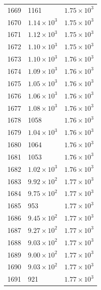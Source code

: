 \begin{table}[H]
\begin{tabular}{lll}
1669 & 1161 & $\displaystyle 1.75 \times 10^{3}$ \\
1670 & $\displaystyle 1.14 \times 10^{3}$ & $\displaystyle 1.75 \times 10^{3}$ \\
1671 & $\displaystyle 1.12 \times 10^{3}$ & $\displaystyle 1.75 \times 10^{3}$ \\
1672 & $\displaystyle 1.10 \times 10^{3}$ & $\displaystyle 1.75 \times 10^{3}$ \\
1673 & $\displaystyle 1.10 \times 10^{3}$ & $\displaystyle 1.76 \times 10^{3}$ \\
1674 & $\displaystyle 1.09 \times 10^{3}$ & $\displaystyle 1.76 \times 10^{3}$ \\
1675 & $\displaystyle 1.05 \times 10^{3}$ & $\displaystyle 1.76 \times 10^{3}$ \\
1676 & $\displaystyle 1.06 \times 10^{3}$ & $\displaystyle 1.76 \times 10^{3}$ \\
1677 & $\displaystyle 1.08 \times 10^{3}$ & $\displaystyle 1.76 \times 10^{3}$ \\
1678 & 1058 & $\displaystyle 1.76 \times 10^{3}$ \\
1679 & $\displaystyle 1.04 \times 10^{3}$ & $\displaystyle 1.76 \times 10^{3}$ \\
1680 & 1064 & $\displaystyle 1.76 \times 10^{3}$ \\
1681 & 1053 & $\displaystyle 1.76 \times 10^{3}$ \\
1682 & $\displaystyle 1.02 \times 10^{3}$ & $\displaystyle 1.76 \times 10^{3}$ \\
1683 & $\displaystyle 9.92 \times 10^{2}$ & $\displaystyle 1.77 \times 10^{3}$ \\
1684 & $\displaystyle 9.75 \times 10^{2}$ & $\displaystyle 1.77 \times 10^{3}$ \\
1685 & 953 & $\displaystyle 1.77 \times 10^{3}$ \\
1686 & $\displaystyle 9.45 \times 10^{2}$ & $\displaystyle 1.77 \times 10^{3}$ \\
1687 & $\displaystyle 9.27 \times 10^{2}$ & $\displaystyle 1.77 \times 10^{3}$ \\
1688 & $\displaystyle 9.03 \times 10^{2}$ & $\displaystyle 1.77 \times 10^{3}$ \\
1689 & $\displaystyle 9.00 \times 10^{2}$ & $\displaystyle 1.77 \times 10^{3}$ \\
1690 & $\displaystyle 9.03 \times 10^{2}$ & $\displaystyle 1.77 \times 10^{3}$ \\
1691 & 921 & $\displaystyle 1.77 \times 10^{3}$ \\

\end{tabular}
\end{table}
